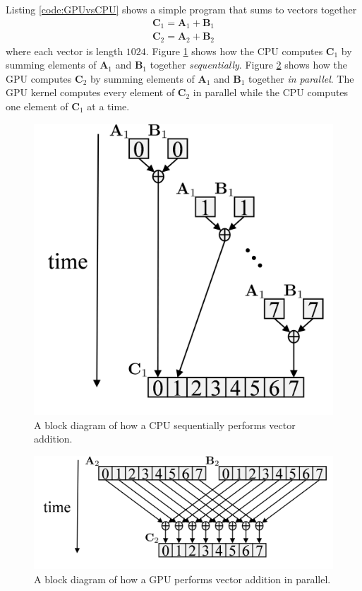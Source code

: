 Listing \ref{code:GPUvsCPU} shows a simple program that sums to vectors together
\begin{equation}
\begin{matrix}
\mathbf{C}_1 = \mathbf{A}_1 + \mathbf{B}_1 \\
\mathbf{C}_2 = \mathbf{A}_2 + \mathbf{B}_2
\end{matrix}
\end{equation}
where each vector is length $1024$.
Figure \ref{fig:CPUaddBlockDiagram} shows how the CPU computes $\mathbf{C}_1$ by summing elements of $\mathbf{A}_1$ and $\mathbf{B}_1$ together \textit{sequentially}.
Figure \ref{fig:GPUaddBlockDiagram} shows how the GPU computes $\mathbf{C}_2$ by summing elements of $\mathbf{A}_1$ and $\mathbf{B}_1$ together \textit{in parallel}.
The GPU kernel computes every element of $\mathbf{C}_2$ in parallel while the CPU computes one element of $\mathbf{C}_1$ at a time.
\begin{figure}
	\centering\includegraphics[width=3.17in/100*55]{figures/gpu_intro/CPUaddBlockDiagram.pdf}
	\caption{A block diagram of how a CPU sequentially performs vector addition.}
	\label{fig:CPUaddBlockDiagram}
\end{figure}
\begin{figure}
	\centering\includegraphics[width=4.69in/100*55]{figures/gpu_intro/GPUaddBlockDiagram.pdf}
	\caption{A block diagram of how a GPU performs vector addition in parallel.}
	\label{fig:GPUaddBlockDiagram}
\end{figure}
